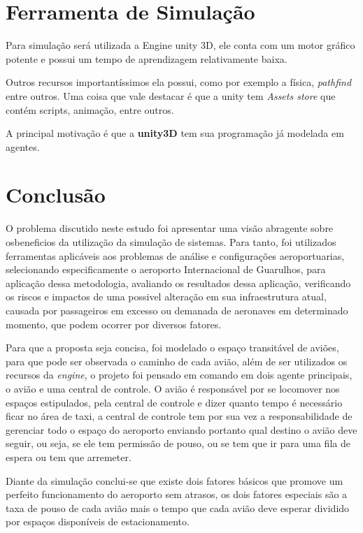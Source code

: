 \documentclass[12pt]{article}
\begin{document}
  
  \section{Ferramenta de Simulação}
  
  Para simulação será utilizada a Engine unity 3D, ele conta com um motor 
  gráfico potente e possui um tempo de aprendizagem relativamente baixa.
  
  Outros recursos importantíssimos ela possui, como por exemplo a física, 
  \textit{pathfind} entre outros. Uma coisa que vale destacar é que a unity
  tem \textit{Assets store} que contém scripts, animação, entre outros.
  
  A principal motivação é que a \textbf{unity3D} tem sua programação já
  modelada em agentes.
  
  
  
  \section{Conclusão}
  
  O problema discutido neste estudo foi apresentar uma visão abragente 
  sobre osbeneficios da utilização da simulação de sistemas. Para tanto, foi 
  utilizados ferramentas aplicáveis aos problemas de análise e configurações 
  aeroportuarias, selecionando especificamente o aeroporto Internacional de
  Guarulhos, para aplicação dessa metodologia, avaliando os resultados dessa
  aplicação, verificando os riscos e impactos de uma possivel alteração em
  sua infraestrutura atual, causada por passageiros em excesso ou demanada de 
  aeronaves em determinado momento, que podem ocorrer por diversos fatores.
  
  Para que a proposta seja concisa, foi modelado o espaço transitável  de aviões, 
  para que pode ser observada o caminho de cada avião, além de ser utilizados os
  recursos da \textit{engine}, o projeto foi pensado em comando em dois agente principais,
  o avião e uma central de controle. O avião é responsável por se locomover nos espaços estipulados, 
  pela central de controle e dizer quanto tempo é necessário ficar no área de taxi, a central
  de controle tem por sua vez a responsabilidade de gerenciar todo o espaço do aeroporto enviando
  portanto qual destino o avião deve seguir, ou seja, se ele tem permissão de pouso, ou se tem
  que ir para uma fila de espera ou tem que arremeter.
  
  Diante da simulação conclui-se que  existe dois fatores básicos que promove um perfeito
  funcionamento do aeroporto sem atrasos, os dois fatores especiais são a taxa de pouso 
  de cada avião mais o tempo que cada avião deve esperar dividido por espaços disponíveis
  de estacionamento. 
  
  
  
  
  
\end{document}
